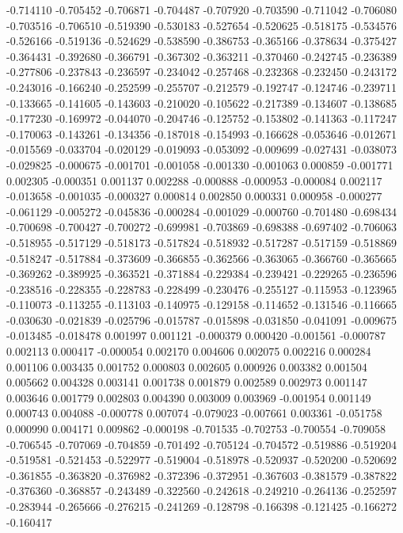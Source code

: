 -0.714110
-0.705452
-0.706871
-0.704487
-0.707920
-0.703590
-0.711042
-0.706080
-0.703516
-0.706510
-0.519390
-0.530183
-0.527654
-0.520625
-0.518175
-0.534576
-0.526166
-0.519136
-0.524629
-0.538590
-0.386753
-0.365166
-0.378634
-0.375427
-0.364431
-0.392680
-0.366791
-0.367302
-0.363211
-0.370460
-0.242745
-0.236389
-0.277806
-0.237843
-0.236597
-0.234042
-0.257468
-0.232368
-0.232450
-0.243172
-0.243016
-0.166240
-0.252599
-0.255707
-0.212579
-0.192747
-0.124746
-0.239711
-0.133665
-0.141605
-0.143603
-0.210020
-0.105622
-0.217389
-0.134607
-0.138685
-0.177230
-0.169972
-0.044070
-0.204746
-0.125752
-0.153802
-0.141363
-0.117247
-0.170063
-0.143261
-0.134356
-0.187018
-0.154993
-0.166628
-0.053646
-0.012671
-0.015569
-0.033704
-0.020129
-0.019093
-0.053092
-0.009699
-0.027431
-0.038073
-0.029825
-0.000675
-0.001701
-0.001058
-0.001330
-0.001063
0.000859
-0.001771
0.002305
-0.000351
0.001137
0.002288
-0.000888
-0.000953
-0.000084
0.002117
-0.013658
-0.001035
-0.000327
0.000814
0.002850
0.000331
0.000958
-0.000277
-0.061129
-0.005272
-0.045836
-0.000284
-0.001029
-0.000760
-0.701480
-0.698434
-0.700698
-0.700427
-0.700272
-0.699981
-0.703869
-0.698388
-0.697402
-0.706063
-0.518955
-0.517129
-0.518173
-0.517824
-0.518932
-0.517287
-0.517159
-0.518869
-0.518247
-0.517884
-0.373609
-0.366855
-0.362566
-0.363065
-0.366760
-0.365665
-0.369262
-0.389925
-0.363521
-0.371884
-0.229384
-0.239421
-0.229265
-0.236596
-0.238516
-0.228355
-0.228783
-0.228499
-0.230476
-0.255127
-0.115953
-0.123965
-0.110073
-0.113255
-0.113103
-0.140975
-0.129158
-0.114652
-0.131546
-0.116665
-0.030630
-0.021839
-0.025796
-0.015787
-0.015898
-0.031850
-0.041091
-0.009675
-0.013485
-0.018478
0.001997
0.001121
-0.000379
0.000420
-0.001561
-0.000787
0.002113
0.000417
-0.000054
0.002170
0.004606
0.002075
0.002216
0.000284
0.001106
0.003435
0.001752
0.000803
0.002605
0.000926
0.003382
0.001504
0.005662
0.004328
0.003141
0.001738
0.001879
0.002589
0.002973
0.001147
0.003646
0.001779
0.002803
0.004390
0.003009
0.003969
-0.001954
0.001149
0.000743
0.004088
-0.000778
0.007074
-0.079023
-0.007661
0.003361
-0.051758
0.000990
0.004171
0.009862
-0.000198
-0.701535
-0.702753
-0.700554
-0.709058
-0.706545
-0.707069
-0.704859
-0.701492
-0.705124
-0.704572
-0.519886
-0.519204
-0.519581
-0.521453
-0.522977
-0.519004
-0.518978
-0.520937
-0.520200
-0.520692
-0.361855
-0.363820
-0.376982
-0.372396
-0.372951
-0.367603
-0.381579
-0.387822
-0.376360
-0.368857
-0.243489
-0.322560
-0.242618
-0.249210
-0.264136
-0.252597
-0.283944
-0.265666
-0.276215
-0.241269
-0.128798
-0.166398
-0.121425
-0.166272
-0.160417

